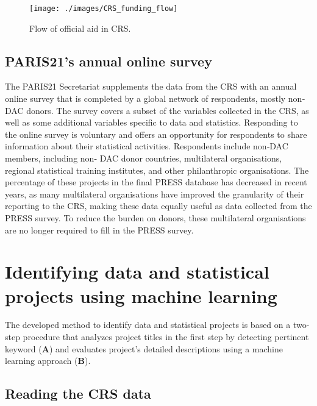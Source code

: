 \documentclass[
]{article}
\begin{document}
\begin{figure}

{\centering \texttt{[image: ./images/CRS\_funding\_flow]} 

}

\caption{Flow of official aid in CRS.}\label{fig:funding-flows}
\end{figure}

\hypertarget{P21-online-survey}{%
\subsection{PARIS21's annual online survey}\label{P21-online-survey}}

The PARIS21 Secretariat supplements the data from the CRS with an annual online survey that is
completed by a global network of respondents, mostly non‐DAC donors. The survey covers a subset
of the variables collected in the CRS, as well as some additional variables specific to data and statistics.
Responding to the online survey is voluntary and offers an opportunity for respondents to share
information about their statistical activities. Respondents include non‐DAC members, including non‐
DAC donor countries, multilateral organisations, regional statistical training institutes, and other
philanthropic organisations. The percentage of these projects in the final PRESS database has
decreased in recent years, as many multilateral organisations have improved the granularity of their
reporting to the CRS, making these data equally useful as data collected from the PRESS survey. To
reduce the burden on donors, these multilateral organisations are no longer required to fill in the
PRESS survey.

\hypertarget{machine-learning}{%
\section{Identifying data and statistical projects using machine learning}\label{machine-learning}}

The developed method to identify data and statistical projects is based on a two-step procedure that analyzes project titles in the first step by detecting pertinent keyword (\textbf{A}) and evaluates project's detailed descriptions using a machine learning approach (\textbf{B}).

\hypertarget{reading-the-crs-data}{%
\subsection{Reading the CRS data}\label{reading-the-crs-data}}
\end{document}

